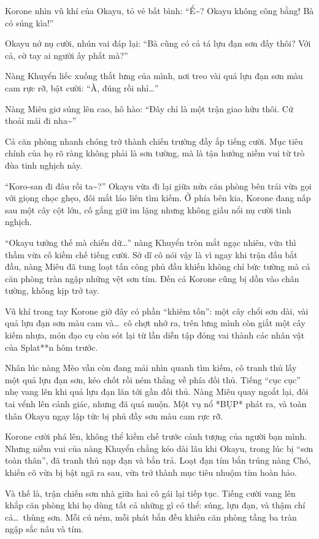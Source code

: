 \documentclass[../main.tex]{subfiles}
\begin{document}
Korone nhìn vũ khí của Okayu, tỏ vẻ bất bình: ``Ể\~{}? Okayu không công bằng! Bà có súng kìa!''

Okayu nở nụ cười, nhún vai đáp lại: ``Bà cũng có cả tá lựu đạn sơn đấy thôi? Với cả, cờ tay ai người ấy phất mà?''

Nàng Khuyển liếc xuống thắt lưng của mình, nơi treo vài quả lựu đạn sơn màu cam rực rỡ, bật cười: ``À, đúng rồi nhỉ\dots''

Nàng Miêu giơ súng lên cao, hô hào: ``Đây chỉ là một trận giao hữu thôi. Cứ thoải mái đi nha\~{}''

Cả căn phòng nhanh chóng trở thành chiến trường đầy ắp tiếng cười. Mục tiêu chính của họ rõ ràng không phải là sơn tường, mà là tận hưởng niềm vui từ trò đùa tinh nghịch này.

\ct

``Koro-san đi đâu rồi ta\~{}?'' Okayu vừa đi lại giữa nửa căn phòng bên trái vừa gọi với giọng chọc ghẹo, đôi mắt láo liên tìm kiếm. Ở phía bên kia, Korone đang nấp sau một cây cột lớn, cố gắng giữ im lặng nhưng không giấu nổi nụ cười tinh nghịch.

``Okayu tưởng thế mà chiến dữ\dots'' nàng Khuyển tròn mắt ngạc nhiên, vừa thì thầm vừa cố kiềm chế tiếng cười. Sở dĩ cô nói vậy là vì ngay khi trận đấu bắt đầu, nàng Miêu đã tung loạt tấn công phủ đầu khiến không chỉ bức tường mà cả căn phòng tràn ngập những vệt sơn tím. Đến cả Korone cũng bị dồn vào chân tường, không kịp trở tay.

Vũ khí trong tay Korone giờ đây có phần ``khiêm tốn'': một cây chổi sơn dài, vài quả lựu đạn sơn màu cam và\dots\ cô chợt nhớ ra, trên lưng mình còn giắt một cây kiếm nhựa, món đạo cụ còn sót lại từ lần diễn tập đóng vai thành các nhân vật của Splat**n hôm trước.

Nhân lúc nàng Mèo vẫn còn đang mải nhìn quanh tìm kiếm, cô tranh thủ lấy một quả lựu đạn sơn, kéo chốt rồi ném thẳng về phía đối thủ. Tiếng ``cục cục'' nhẹ vang lên khi quả lựu đạn lăn tới gần đối thủ. Nàng Miêu quay ngoắt lại, đôi tai vểnh lên cảnh giác, nhưng đã quá muộn. Một vụ nổ *BỤP* phát ra, và toàn thân Okayu ngay lập tức bị phủ đầy sơn màu cam rực rỡ.

Korone cười phá lên, không thể kiềm chế trước cảnh tượng của người bạn mình. Nhưng niềm vui của nàng Khuyển chẳng kéo dài lâu khi Okayu, trong lúc bị ``sơn toàn thân'', đã tranh thủ nạp đạn và bắn trả. Loạt đạn tím bắn trúng nàng Chó, khiến cô vừa bị bật ngã ra sau, vừa trở thành mục tiêu nhuộm tím hoàn hảo.

Và thế là, trận chiến sơn nhà giữa hai cô gái lại tiếp tục. Tiếng cười vang lên khắp căn phòng khi họ dùng tất cả những gì có thể: súng, lựu đạn, và thậm chí cả\dots\ thùng sơn. Mỗi cú ném, mỗi phát bắn đều khiến căn phòng tầng ba tràn ngập sắc nâu và tím.
\end{document}
